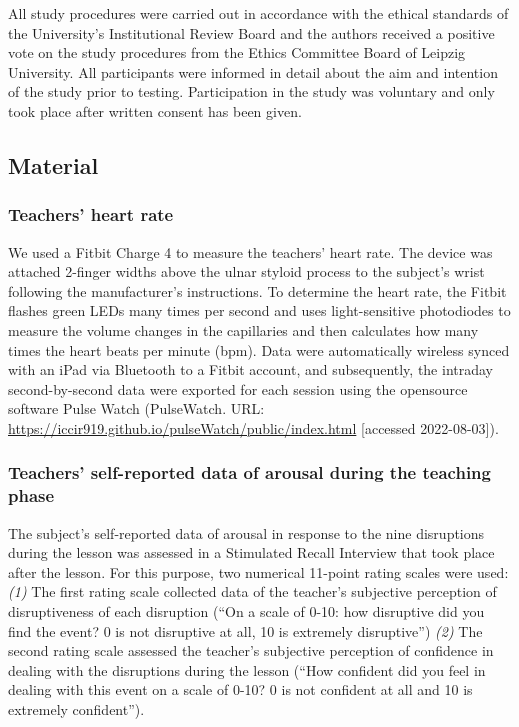 \documentclass[
  man,floatsintext]{apa6}
\begin{document}
All study procedures were carried out in accordance with the ethical standards of the University's Institutional Review Board and the authors received a positive vote on the study procedures from the Ethics Committee Board of Leipzig University. All participants were informed in detail about the aim and intention of the study prior to testing. Participation in the study was voluntary and only took place after written consent has been given.

\hypertarget{material}{%
\subsection{Material}\label{material}}

\hypertarget{teachers-heart-rate}{%
\subsubsection{Teachers' heart rate}\label{teachers-heart-rate}}

We used a Fitbit Charge 4 to measure the teachers' heart rate. The device was attached 2-finger widths above the ulnar styloid process to the subject's wrist following the manufacturer's instructions. To determine the heart rate, the Fitbit flashes green LEDs many times per second and uses light-sensitive photodiodes to measure the volume changes in the capillaries and then calculates how many times the heart beats per minute (bpm). Data were automatically wireless synced with an iPad via Bluetooth to a Fitbit account, and subsequently, the intraday second-by-second data were exported for each session using the opensource software Pulse Watch (PulseWatch. URL: \url{https://iccir919.github.io/pulseWatch/public/index.html} {[}accessed 2022-08-03{]}).

\hypertarget{teachers-self-reported-data-of-arousal-during-the-teaching-phase}{%
\subsubsection{Teachers' self-reported data of arousal during the teaching phase}\label{teachers-self-reported-data-of-arousal-during-the-teaching-phase}}

The subject's self-reported data of arousal in response to the nine disruptions during the lesson was assessed in a Stimulated Recall Interview that took place after the lesson. For this purpose, two numerical 11-point rating scales were used: \emph{(1)} The first rating scale collected data of the teacher's subjective perception of disruptiveness of each disruption (``On a scale of 0-10: how disruptive did you find the event? 0 is not disruptive at all, 10 is extremely disruptive'') \emph{(2)} The second rating scale assessed the teacher's subjective perception of confidence in dealing with the disruptions during the lesson (``How confident did you feel in dealing with this event on a scale of 0-10? 0 is not confident at all and 10 is extremely confident'').
\end{document}

